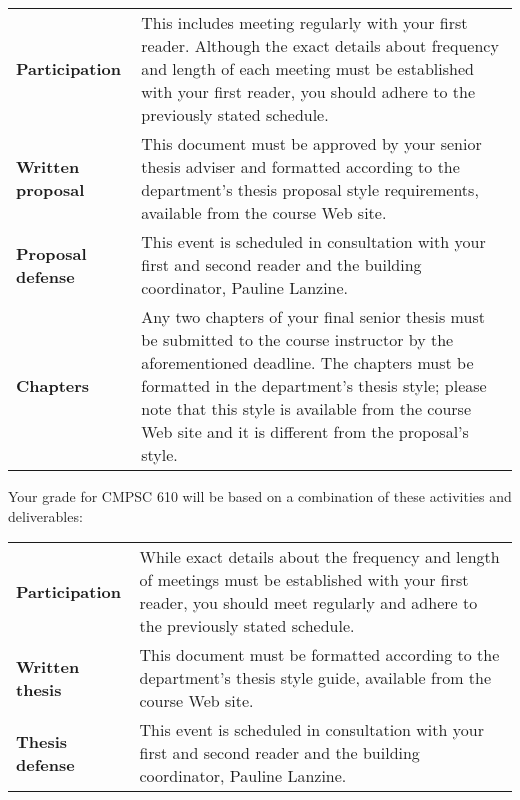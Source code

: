 % 

\begin{center}
\begin{tabular}{lp{4in}}

\bf Participation & This includes meeting regularly with your first reader. Although the exact details about frequency and
length of each meeting must be established with your first reader, you should adhere to the previously stated schedule.
\\[.1in]

\bf Written proposal & This document must be approved by your senior thesis adviser and formatted according to the 
department's thesis proposal style requirements, available from the course Web site. \\[.1in]

\bf Proposal defense & This event is scheduled in consultation with your first and second reader and the building
coordinator, Pauline Lanzine. \\[.1in]

\bf Chapters & Any two chapters of your final senior thesis must be submitted to the course instructor by the
aforementioned deadline.  The chapters must be formatted in the department's thesis style; please note that
this style is available from the course Web site and it is different from the proposal's style.

\end{tabular}
\end{center}


\vspace*{-.15in}
\noindent
Your grade for CMPSC 610 will be based on a combination of these activities and deliverables:
\begin{center}
\begin{tabular}{lp{4in}}
\bf Participation & While exact details about the frequency and length of meetings must be established with your first
reader, you should meet regularly and adhere to the previously stated schedule. \\[.1in]

\bf Written thesis & This document must be formatted according to the department's thesis style guide, available from
the course Web site. \\[.1in]

\bf Thesis defense & This event is scheduled in consultation with your first and second reader and the building
coordinator, Pauline Lanzine. \\[.1in]

% 
\end{tabular}
\end{center}

